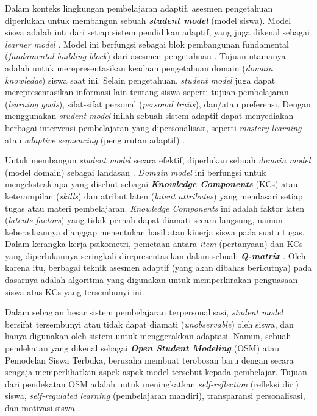 Dalam konteks lingkungan pembelajaran adaptif, asesmen pengetahuan diperlukan
untuk membangun sebuah \textbf{\textit{student model}} (model siswa). Model
siswa adalah inti dari setiap sistem pendidikan adaptif, yang juga dikenal
sebagai \textit{learner model} \autocite{Brusilovsky2016}. Model ini berfungsi
sebagai blok pembangunan fundamental (\textit{fundamental building block}) dari
asesmen pengetahuan \autocite{Minn2022}. Tujuan utamanya adalah untuk
merepresentasikan keadaan pengetahuan domain (\textit{domain knowledge})
siswa saat ini. Selain pengetahuan, \textit{student model} juga dapat
merepresentasikan informasi lain tentang siswa seperti tujuan pembelajaran
(\textit{learning goals}), sifat-sifat personal (\textit{personal traits}),
dan/atau preferensi. Dengan menggunakan
\textit{student model} inilah sebuah sistem adaptif dapat menyediakan berbagai
intervensi pembelajaran yang dipersonalisasi, seperti
\textit{mastery learning} atau \textit{adaptive sequencing}
(pengurutan adaptif) \autocite{Brusilovsky2016}.

Untuk membangun \textit{student model} secara efektif, diperlukan sebuah
\textit{domain model} (model domain) sebagai landasan \autocite{Minn2022}.
\textit{Domain model} ini berfungsi untuk mengekstrak apa yang disebut sebagai
\textit{\textbf{Knowledge Components}} (KCs) atau keterampilan (\textit{skills})
dan atribut laten (\textit{latent attributes}) yang mendasari setiap tugas atau
materi pembelajaran. \textit{Knowledge Components} ini adalah
faktor laten (\textit{latents factors}) yang tidak pernah dapat diamati secara
langsung, namun keberadaannya dianggap menentukan hasil atau kinerja siswa pada
suatu tugas. Dalam kerangka kerja psikometri,
pemetaan antara \textit{item} (pertanyaan) dan KCs yang diperlukannya seringkali
direpresentasikan dalam sebuah \textit{\textbf{Q-matrix}} \autocite{Minn2022}.
Oleh karena itu, berbagai teknik asesmen adaptif (yang akan dibahas berikutnya)
pada dasarnya adalah algoritma yang digunakan untuk memperkirakan penguasaan
siswa atas KCs yang tersembunyi ini.

Dalam sebagian besar sistem pembelajaran terpersonalisasi,
\textit{student model} bersifat tersembunyi atau tidak dapat diamati
(\textit{unobservable}) oleh siswa, dan hanya digunakan oleh sistem untuk
menggerakkan adaptasi. Namun, sebuah pendekatan yang
dikenal sebagai \textbf{\textit{Open Student Modeling}} (OSM) atau
Pemodelan Siswa Terbuka, berusaha membuat terobosan baru dengan secara sengaja
memperlihatkan aspek-aspek model tersebut kepada pembelajar. Tujuan dari
pendekatan OSM adalah untuk meningkatkan \textit{self-reflection} (refleksi diri)
siswa, \textit{self-regulated learning} (pembelajaran mandiri),
transparansi personalisasi, dan motivasi siswa
\autocite{Brusilovsky2016, Ihichr2024}.

